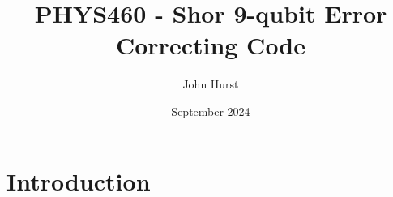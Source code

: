 \documentclass[12pt]{extarticle}
\title{PHYS460 - Shor 9-qubit Error Correcting Code}
\author{John Hurst}
\date{September 2024}
\begin{document}
\maketitle

\section{Introduction}

\newcommand{\boxlogicalgate}{\multigate{8}{\rotatebox{90}{\text{Logical Gate $U_L$}}} \barrier[-0.1em]{8}}
\newcommand{\boxnoisechannel}{\multigate{8}{\rotatebox{90}{\text{Noise Channel $\calN$}}} \barrier[0em]{8}}
\newcommand{\boxrecovery}{\multigate{8}{\rotatebox{90}{\text{Recovery $\calR$}}} \barrier[0em]{8}}
\newcommand{\boxdecoding}{\multigate{8}{\rotatebox{90}{\text{Decoding $\calD$}}}}
\newcommand{\initq}[1]{\push{q_{#1} \ket{0}}{1em}}
\newcommand{\inita}[1]{\push{a_{#1} \ket{0}}{1em}}
\end{document}
